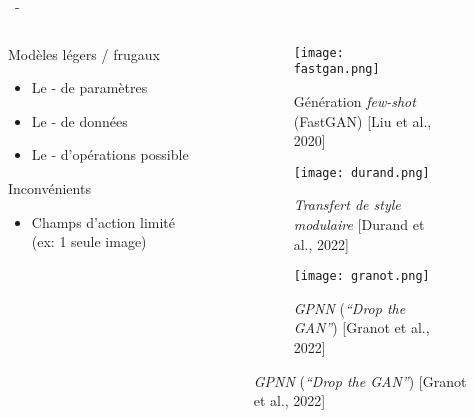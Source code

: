 \documentclass[aspectratio=169, 22pt]{beamer}
\begin{document}
\begin{frame}{\secname~- \subsecname}
  \begin{columns}
    \begin{column}{0.5\linewidth}
      \begin{customblock}{Modèles légers / frugaux}        
        \begin{itemize}
        \item \small Le - de paramètres
        \item \small Le - de données
        \item \small Le - d'opérations possible
        \end{itemize}
      \end{customblock}
      \begin{alertblock}{Inconvénients}
        \begin{itemize}
        \item \small Champs d'action limité (ex: 1 seule image)
        \end{itemize}
      \end{alertblock}
    \end{column}
    \begin{column}{0.5\linewidth}
      \begin{figure}
        \begin{subfigure}{0.45\linewidth}
          \centering
          \texttt{[image: fastgan.png]}
          \caption{Génération \emph{few-shot} (FastGAN) [Liu et al., 2020]}
        \end{subfigure}
        \begin{subfigure}{0.45\linewidth}
          \centering
          \texttt{[image: durand.png]}
          \caption{\emph{Transfert de style modulaire} [Durand et al., 2022]}
        \end{subfigure}
        
        \begin{subfigure}{\linewidth}
          \centering
          \texttt{[image: granot.png]}
          \caption{\emph{GPNN} (\emph{``Drop the GAN''}) [Granot et al., 2022]}
        \end{subfigure}
      \end{figure}
    \end{column}
  \end{columns}  
\end{frame}
\end{document}
